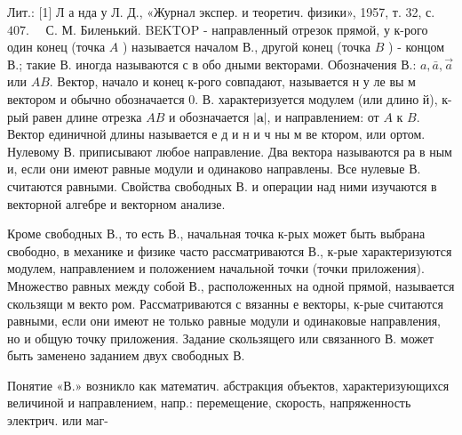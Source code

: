 \documentclass[10pt]{article}
\begin{document}
Лит.: [1] Л а нда у Л. Д., «Журнал экспер. и теоретич. физики», 1957, т. 32, с. $407 . \quad$ С. М. Биленький. BEKTOP - направленный отрезок прямой, у к-рого один конец (точка $A$ ) называется началом В., другой конец (точка $B$ ) - концом В.; такие В. иногда называются с в обо дными векторами. Обозначения В.: $a, \bar{a}, \vec{a}$ или $A B$. Вектор, начало и конец к-рого совпадают, называется н у ле вы м вектором и обычно обозначается 0. В. характеризуется модулем (или длино й), к-рый равен длине отрезка $A B$ и обозначается $|\boldsymbol{a}|$, и направлением: от $A$ к $B$. Вектор единичной длины называется е д и н и ч ны м ве ктором, или ортом. Нулевому В. приписывают любое направление. Два вектора называются ра в ным и, если они имеют равные модули и одинаково направлены. Все нулевые В. считаются равными. Свойства свободных В. и операции над ними изучаются в векторной алгебре и векторном анализе.



Кроме свободных В., то есть В., начальная точка к-рых может быть выбрана свободно, в механике и физике часто рассматриваются В., к-рые характеризуются модулем, направлением и положением начальной точки (точки приложения). Множество равных между собой В., расположенных на одной прямой, называется скользящи м векто ром. Рассматриваются с вязанны е векторы, к-рые считаются равными, если они имеют не только равные модули и одинаковые направления, но и общую точку приложения. Задание скользящего или связанного В. может быть заменено заданием двух свободных В.



Понятие «В.» возникло как математич. абстракция объектов, характеризующихся величиной и направлением, напр.: перемещение, скорость, напряженность электрич. или маг-
\end{document}

